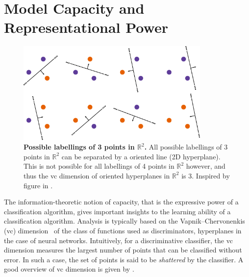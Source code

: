 \documentclass[thesis]{subfiles}
\begin{document}
    \section{Model Capacity and Representational Power}
    \begin{figure}[tbp]
        \centering
        \includegraphics[width=0.85\textwidth]{Figs/PDF/allpossibler3}
        \caption[Possible labellings of 3 points in $\mathbb{R}^2$. ]{\textbf{Possible labellings of 3 points in $\mathbb{R}^2$.} All possible labellings of 3 points in $\mathbb{R}^2$ can be separated by a oriented line (2D hyperplane). This is not possible for all labellings of 4 points in $\mathbb{R}^2$ however, and thus the \gls{vc} dimension of oriented hyperplanes in $\mathbb{R}^2$ is 3. Inspired by figure in \citet{burges1998tutorial}.}\label{fig:vcdim_r2line}
    \end{figure}
    The information-theoretic notion of capacity, that is the expressive power of a classification algorithm, gives important insights to the learning ability of a classification algorithm. Analysis is typically based on the Vapnik–Chervonenkis (\gls{vc}) dimension~\citep{vapnik2015uniform} of the class of functions used as discriminators, \eg hyperplanes in the case of neural networks. Intuitively, for a discriminative classifier, the \gls{vc} dimension measures the largest number of points that can be classified without error. In such a case, the set of points is said to be \emph{shattered} by the classifier. A good overview of \gls{vc} dimension is given by \citet{burges1998tutorial}.
    
\end{document}
